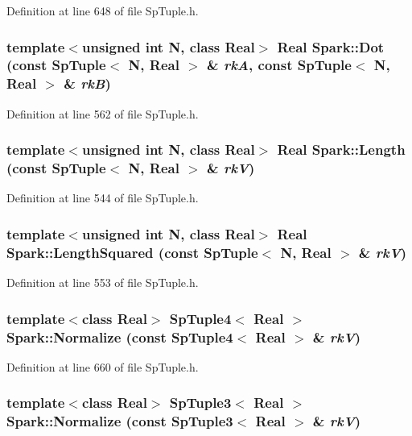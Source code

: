 Definition at line 648 of file Sp\-Tuple.h.
\subsubsection{\setlength{\rightskip}{0pt plus 5cm}template$<$unsigned int N, class Real$>$ Real Spark::Dot (const Sp\-Tuple$<$ N, Real $>$ \& {\em rk\-A}, const Sp\-Tuple$<$ N, Real $>$ \& {\em rk\-B})}\label{namespaceSpark_a121}


Definition at line 562 of file Sp\-Tuple.h.
\subsubsection{\setlength{\rightskip}{0pt plus 5cm}template$<$unsigned int N, class Real$>$ Real Spark::Length (const Sp\-Tuple$<$ N, Real $>$ \& {\em rk\-V})}\label{namespaceSpark_a119}


Definition at line 544 of file Sp\-Tuple.h.
\subsubsection{\setlength{\rightskip}{0pt plus 5cm}template$<$unsigned int N, class Real$>$ Real Spark::Length\-Squared (const Sp\-Tuple$<$ N, Real $>$ \& {\em rk\-V})}\label{namespaceSpark_a120}


Definition at line 553 of file Sp\-Tuple.h.
\subsubsection{\setlength{\rightskip}{0pt plus 5cm}template$<$class Real$>$ Sp\-Tuple4$<$ Real $>$ Spark::Normalize (const Sp\-Tuple4$<$ Real $>$ \& {\em rk\-V})}\label{namespaceSpark_a128}


Definition at line 660 of file Sp\-Tuple.h.
\subsubsection{\setlength{\rightskip}{0pt plus 5cm}template$<$class Real$>$ Sp\-Tuple3$<$ Real $>$ Spark::Normalize (const Sp\-Tuple3$<$ Real $>$ \& {\em rk\-V})}\label{namespaceSpark_a125}


